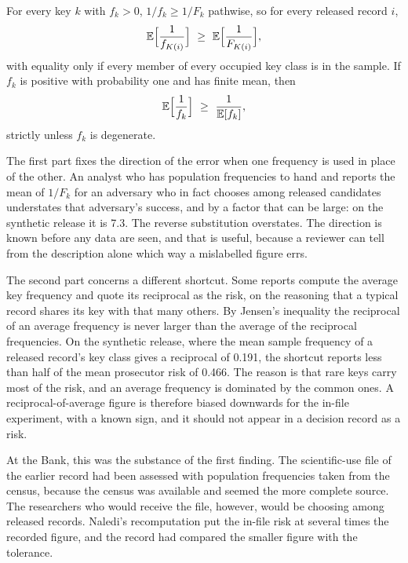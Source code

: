 \begin{proposition}\label{c03:prop-plugin}
For every key $k$ with $f_k > 0$, $1/f_k \ge 1/F_k$ pathwise, so for every released
record $i$,
\begin{equation}\label{c03:eq-order}
\E\Big[\frac{1}{f_{K(i)}}\Big] \ \ge\ \E\Big[\frac{1}{F_{K(i)}}\Big],
\end{equation}
with equality only if every member of every occupied key class is in the sample. If
$f_k$ is positive with probability one and has finite mean, then
\begin{equation}\label{c03:eq-jensen}
\mathbb{E}\Big[\frac{1}{f_k}\Big] \ \ge\ \frac{1}{\mathbb{E}[f_k]},
\end{equation}
strictly unless $f_k$ is degenerate.
\end{proposition}

The first part fixes the direction of the error when one frequency is used in place of
the other. An analyst who has population frequencies to hand and reports the mean of
$1/F_k$ for an adversary who in fact chooses among released candidates understates that
adversary's success, and by a factor that can be large: on the synthetic release it is
7.3. The reverse substitution overstates. The direction is known before any data are
seen, and that is useful, because a reviewer can tell from the description alone which
way a mislabelled figure errs.

The second part concerns a different shortcut. Some reports compute the average key
frequency and quote its reciprocal as the risk, on the reasoning that a typical record
shares its key with that many others. By Jensen's inequality the reciprocal of an
average frequency is never larger than the average of the reciprocal frequencies. On the
synthetic release, where the mean sample frequency of a released record's key class
gives a reciprocal of 0.191, the shortcut reports less than half of the mean prosecutor
risk of 0.466.
The reason is that rare keys carry most of the risk, and an average frequency is
dominated by the common ones. A reciprocal-of-average figure is therefore biased
downwards for the in-file experiment, with a known sign, and it should not appear in a
decision record as a risk.

At the Bank, this was the substance of the first finding. The scientific-use file of
the earlier record had been assessed with population frequencies taken from the census,
because the census was available and seemed the more complete source. The researchers
who would receive the file, however, would be choosing among released records. Naledi's
recomputation put the in-file risk at several times the recorded figure, and the record had compared the smaller figure with the tolerance.

